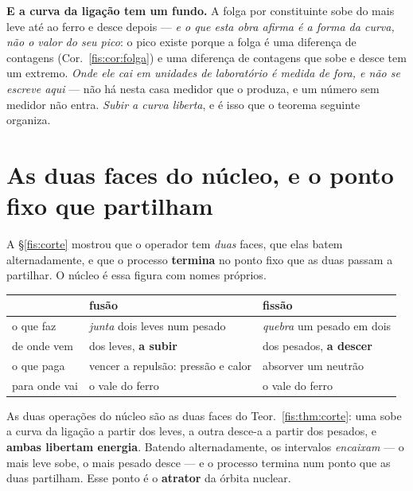 \documentclass[livro.tex]{subfiles}
\begin{document}
\medskip\noindent\textbf{E a curva da ligação tem um fundo.} A folga por
constituinte sobe do mais leve até ao ferro e desce depois --- \emph{e o que esta
obra afirma é a forma da curva, não o valor do seu pico}: o pico existe porque a
folga é uma diferença de contagens (Cor.~\ref{fis:cor:folga}) e uma diferença de
contagens que sobe e desce tem um extremo. \emph{Onde ele cai em unidades de
laboratório é medida de fora, e não se escreve aqui} --- não há nesta casa
medidor que o produza, e um número sem medidor não entra. \emph{Subir a curva
liberta}, e é isso que o teorema seguinte organiza.

\section{As duas faces do núcleo, e o ponto fixo que partilham}\label{fis:fusaofissao}

\noindent A §\ref{fis:corte} mostrou que o operador tem \emph{duas} faces, que
elas batem alternadamente, e que o processo \textbf{termina} no ponto fixo que as
duas passam a partilhar. O núcleo é essa figura com nomes próprios.

\begin{center}\small
\begin{tabular}{@{}lll@{}}
\toprule
 & \textbf{fusão} & \textbf{fissão} \\
\midrule
o que faz & \emph{junta} dois leves num pesado & \emph{quebra} um pesado em dois \\
de onde vem & dos leves, \textbf{a subir} & dos pesados, \textbf{a descer} \\
o que paga & vencer a repulsão: pressão e calor & absorver um neutrão \\
para onde vai & o vale do ferro & o vale do ferro \\
\bottomrule
\end{tabular}
\end{center}

\begin{teorema}\label{fis:thm:ferro}
As duas operações do núcleo são as duas faces do Teor.~\ref{fis:thm:corte}: uma
sobe a curva da ligação a partir dos leves, a outra desce-a a partir dos pesados,
e \textbf{ambas libertam energia}. Batendo alternadamente, os intervalos
\emph{encaixam} --- o mais leve sobe, o mais pesado desce --- e o processo
termina num ponto que as duas partilham. Esse ponto é o \textbf{atrator} da
órbita nuclear.
\end{teorema}
\end{document}
